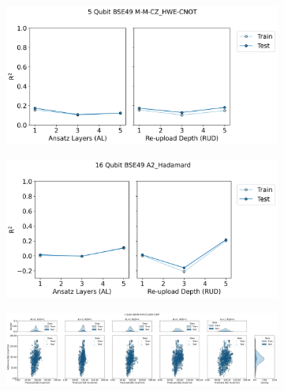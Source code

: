 \documentclass[journal=jacsat,manuscript=article]{achemso}
\begin{document}
\begin{figure}[H]
	\centering	
	\begin{subfigure}[b]{0.49\textwidth}
		\centering
		\includegraphics[width=\linewidth]{../images/BSE/fivequbit/BSE5_RUDAL_lineplot}
		\caption{}
		\label{fig:bse5RUDAL_lineplot}
	\end{subfigure}
	\hfill
	\begin{subfigure}[b]{0.49\textwidth}
		\centering
		\includegraphics[width=\linewidth]{../images/BSE/sixteenqubit/BSE16_RUDAL_lineplot}
		\caption{}
		\label{fig:bse16RUDAL_lineplot}
	\end{subfigure}
	\hfill
	\begin{subfigure}[b]{\textwidth}
		\centering
		\includegraphics[width=\linewidth]{../images/BSE/fivequbit/distribution_parity}
		\caption{}
		\label{fig:BSE5_distribution_parity}
	\end{subfigure}

\end{figure}
\end{document}

